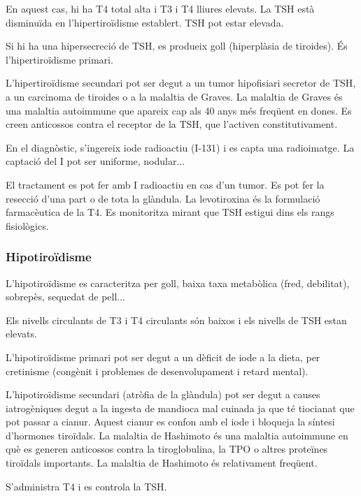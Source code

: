 En aquest cas, hi ha T4  total alta i T3 i T4 lliures elevats. La TSH
està disminuïda en l'hipertiroïdisme establert. TSH pot estar elevada.

Si hi ha una hipersecreció de TSH, es produeix goll (hiperplàsia de
tiroides). És l'hipertiroïdisme primari.

L'hipertiroïdisme secundari pot ser degut a un tumor hipofisiari
secretor de TSH, a un carcinoma de tiroides o a la malaltia de
Graves. La malaltia de Graves és una malaltia autoimmune que apareix
cap als 40 anys més freqüent en dones. Es creen anticossos contra el
receptor de la TSH, que l'activen constitutivament.

En el diagnòstic, s'ingereix iode radioactiu (I-131) i es capta una
radioimatge. La captació del I pot ser uniforme, nodular...

El tractament es pot fer amb I radioactiu en cas d'un tumor. Es pot
fer la resecció d'una part o de tota la glàndula. La levotiroxina és
la formulació farmacèutica de la T4. Es monitoritza mirant que TSH
estigui dins els rangs fisiològics.

\subsubsection{Hipotiroïdisme}
\label{sec:hipotiroidisme}
L'hipotiroïdisme es caracteritza per goll, baixa taxa metabòlica
(fred, debilitat), sobrepès, sequedat de pell...

Els nivells circulants de T3 i T4 circulants són baixos i els nivells
de TSH estan elevats.

L'hipotiroïdisme primari pot ser degut a un dèficit de iode a la
dieta, per cretinisme (congènit i problemes de desenvolupament i
retard mental). 

L'hipotiroïdisme secundari (atròfia de la glàndula) pot ser degut a
causes iatrogèniques degut a la ingesta de mandioca mal cuinada ja que
té tiocianat que pot passar a cianur. Aquest cianur es confon amb el
iode i bloqueja la síntesi d'hormones tiroïdals. La malaltia de
Hashimoto és una malaltia autoimmune en què es generen anticossos
contra la tiroglobulina, la TPO o altres proteïnes tiroïdals
importants. La malaltia de Hashimoto és relativament freqüent.

S'administra T4 i es controla la TSH.

